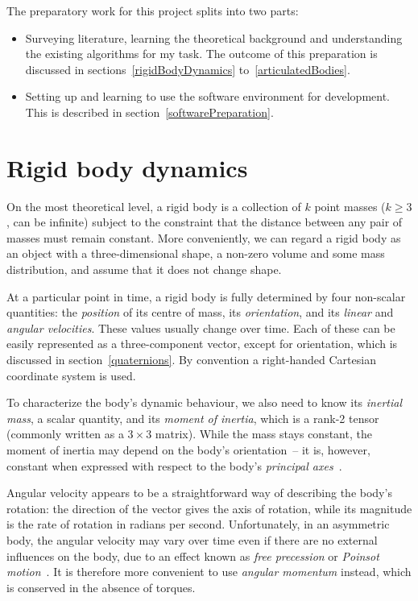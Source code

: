 The preparatory work for this project splits into two parts:
\begin{itemize}
\item Surveying literature, learning the theoretical background and understanding the existing
    algorithms for my task. The outcome of this preparation is discussed in
    sections~\ref{rigidBodyDynamics} to~\ref{articulatedBodies}.
\item Setting up and learning to use the software environment for development. This is described
    in section~\ref{softwarePreparation}.
\end{itemize}

\section{Rigid body dynamics\label{rigidBodyDynamics}}
On the most theoretical level, a rigid body is a collection of $k$ point masses ($k \ge 3$,
can be infinite) subject to the constraint that the distance between any pair of masses must
remain constant. More conveniently, we can regard a rigid body as an object with a
three-dimensional shape, a non-zero volume and some mass distribution, and assume that it does not
change shape.

At a particular point in time, a rigid body is fully determined by four non-scalar quantities: the
\emph{position} of its centre of mass, its \emph{orientation}, and its \emph{linear} and
\emph{angular velocities}. These values usually change over time. Each of these can be easily
represented as a three-component vector, except for orientation, which is discussed in
section~\ref{quaternions}. By convention a right-handed Cartesian coordinate system is used.

To characterize the body's dynamic behaviour, we also need to know its \emph{inertial mass},
a scalar quantity, and its \emph{moment of inertia}, which is a rank-2 tensor (commonly written
as a $3\times3$ matrix). While the mass stays constant, the moment of inertia may
depend on the body's orientation~-- it is, however, constant when expressed with respect to the
body's \emph{principal axes}~\cite{Feynman:63,Goldstein:80}.

Angular velocity appears to be a straightforward way of describing the body's rotation: the
direction of the vector gives the axis of rotation, while its magnitude is the rate of rotation
in radians per second. Unfortunately, in an asymmetric body, the angular velocity may vary over
time even if there are no external influences on the body, due to an effect
known as \emph{free precession} or \emph{Poinsot motion}~\cite{Goldstein:80,Julian:notes}. It is
therefore more convenient to use \emph{angular momentum} instead, which is conserved in the
absence of torques.

